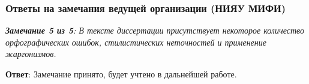 \begin{frame}
	\frametitle{Ответы на замечания ведущей организации (НИЯУ МИФИ)}
	\small{\textit{\textbf{Замечание 5 из 5}: В тексте диссертации присутствует некоторое количество орфографических ошибок, стилистических неточностей и применение жаргонизмов.}}
	
	\hfill
	
	\textbf{Ответ}: Замечание принято, будет учтено в дальнейшей работе.
	
\end{frame}
